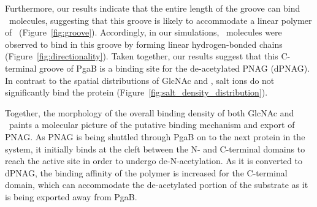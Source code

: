 Furthermore, our results indicate that the entire length of the groove can bind \glucosamine\ molecules, suggesting that this groove is likely to accommodate a linear polymer of \glucosamine\ (Figure~\ref{fig:groove}). Accordingly, in our simulations, \glucosamine\ molecules were observed to bind in this groove by forming linear hydrogen-bonded chains (Figure~\ref{fig:directionality}).  Taken together,  our results suggest that this C-terminal groove of PgaB is a binding site for the de-acetylated PNAG (dPNAG).   In contrast to the spatial distributions of GlcNAc and \glucosamine, salt ions do not significantly bind the protein  (Figure~\ref{fig:salt_density_distribution}). 

Together, the morphology of the overall binding density of both GlcNAc and \glucosamine\ paints a molecular picture of the putative binding mechanism and export of PNAG. As PNAG is being shuttled through PgaB on to the next protein in the system, it initially binds at the cleft between the N- and C-terminal domains to reach the active site in order to undergo de-N-acetylation.  As it is converted to dPNAG, the binding affinity of the polymer is increased for the C-terminal domain, which can accommodate the de-acetylated portion of the substrate as it is being exported away from PgaB.



